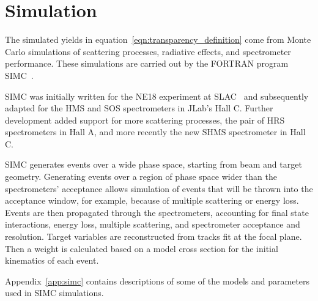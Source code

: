 \section{Simulation} \label{sec:simulation_intro}
The simulated yields in equation~\ref{eqn:transparency_definition} come from
Monte Carlo simulations of scattering processes, radiative effects,
and spectrometer performance.
These simulations are carried out by the FORTRAN program
SIMC~\cite{simc_github, simc_wiki}.


SIMC was initially written for the NE18 experiment at
SLAC~\cite{Makins_1994} and subsequently adapted for the HMS and SOS
spectrometers in JLab's Hall C.
Further development added support for more scattering processes, the pair of
HRS spectrometers in Hall A, and more recently the new SHMS spectrometer in
Hall C.


SIMC generates events over a wide phase space, starting from beam and
target geometry.
Generating events over a region of phase space wider than the spectrometers'
acceptance allows simulation of events that will be thrown into the acceptance
window, for example, because of multiple scattering or energy loss.
Events are then propagated through the spectrometers, accounting for final
state interactions, energy loss, multiple scattering, and spectrometer
acceptance and resolution.
Target variables are reconstructed from tracks fit at the focal plane.
Then a weight is calculated based on a model cross section for the initial
kinematics of each event.


Appendix~\ref{app:simc} contains descriptions of some of the models and
parameters used in SIMC simulations.
